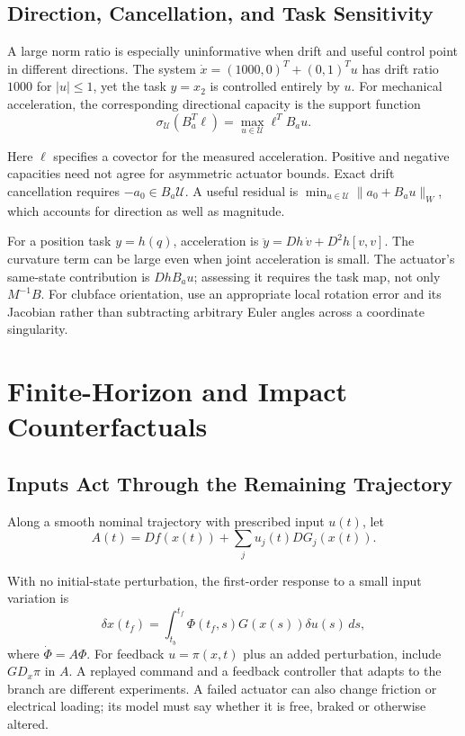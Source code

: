 \subsection{Direction, Cancellation, and Task Sensitivity}
A large norm ratio is especially uninformative when drift and useful control point in different directions. The system $\dot x=(1000,0)^T+(0,1)^Tu$ has drift ratio $1000$ for $|u|\leq1$, yet the task $y=x_2$ is controlled entirely by $u$. For mechanical acceleration, the corresponding directional capacity is the support function
\begin{equation}
\sigma_{\mathcal U}(B_a^T\ell)=\max_{u\in\mathcal U}\ell^TB_a u.
\label{eq:ch7:directional-capacity}
\end{equation}

Here $\ell$ specifies a covector for the measured acceleration. Positive and negative capacities need not agree for asymmetric actuator bounds. Exact drift cancellation requires $-a_0\in B_a\mathcal U$. A useful residual is $\min_{u\in\mathcal U}\|a_0+B_a u\|_W$, which accounts for direction as well as magnitude.

For a position task $y=h(q)$, acceleration is $\ddot y=D h\,\dot v+D^2h[v,v]$. The curvature term can be large even when joint acceleration is small. The actuator's same-state contribution is $D h B_a u$; assessing it requires the task map, not only $M^{-1}B$. For clubface orientation, use an appropriate local rotation error and its Jacobian rather than subtracting arbitrary Euler angles across a coordinate singularity.

\section{Finite-Horizon and Impact Counterfactuals}
\label{sec:ch7:horizon}

\subsection{Inputs Act Through the Remaining Trajectory}
Along a smooth nominal trajectory with prescribed input $u(t)$, let
\begin{equation}
A(t)=D f(x(t))+\sum_j u_j(t)D G_j(x(t)).
\label{eq:ch7:nominal-jacobian}
\end{equation}

With no initial-state perturbation, the first-order response to a small input variation is
\begin{equation}
\delta x(t_f)=\int_{t_b}^{t_f}\Phi(t_f,s)G(x(s))\delta u(s)\,ds,
\label{eq:ch7:sensitivity-eq}
\end{equation}
\label{eq:ch7:actuator-failure}
where $\dot\Phi=A\Phi$. For feedback $u=\pi(x,t)$ plus an added perturbation, include $G D_x\pi$ in $A$. A replayed command and a feedback controller that adapts to the branch are different experiments. A failed actuator can also change friction or electrical loading; its model must say whether it is free, braked or otherwise altered.

